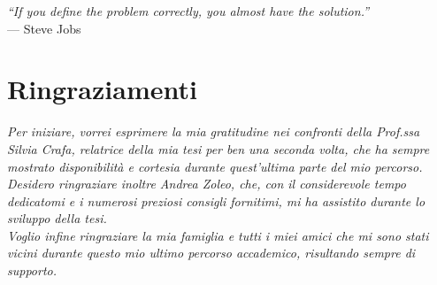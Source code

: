 
{}
{}

\begin{flushright}{
	\slshape    
	``If you define the problem correctly, you almost have the solution.''} \\ 
	\medskip
    --- Steve Jobs
\end{flushright}


\bigskip

\begingroup
\let\clearpage\relax
\let\cleardoublepage\relax
\let\cleardoublepage\relax

\chapter*{Ringraziamenti}
\noindent \textit{Per iniziare, vorrei esprimere la mia gratitudine nei confronti della Prof.ssa Silvia Crafa, relatrice della mia tesi per ben una seconda volta, che ha sempre mostrato disponibilità e cortesia durante quest'ultima parte del mio percorso.}\\

\noindent \textit{Desidero ringraziare inoltre Andrea Zoleo, che, con il considerevole tempo dedicatomi e i numerosi preziosi consigli fornitimi, mi ha assistito durante lo sviluppo della tesi.}\\

\noindent \textit{Voglio infine ringraziare la mia famiglia e tutti i miei amici che mi sono stati vicini durante questo mio ultimo percorso accademico, risultando sempre di supporto.}\\



\endgroup

